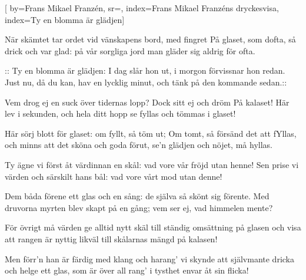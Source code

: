 

[ 		%
	by={Frans Mikael Franzén},					%
	sr={},					%
	index={Frans Mikael Franzéns dryckesvisa}, %
	index={Ty en blomma är glädjen}]						%
	
\beginverse*						%
När skämtet tar ordet vid vänskapens bord,
med fingret På glaset, som dofta,
så drick och var glad: på vår sorgliga jord
man gläder sig aldrig för ofta.
\endverse							%

\beginchorus						%
:: Ty en blomma är glädjen: I dag slår hon ut,
i morgon förvissnar hon redan.
Just nu, då du kan, hav en lycklig minut,
och tänk på den kommande sedan.::
\endchorus							%

\beginverse*						%
Vem drog ej en suck över tidernas lopp?
Dock sitt ej och dröm På kalaset!
Här lev i sekunden, och hela ditt hopp
se fyllas och tömmas i glaset!
\endverse							%

\beginchorus						%
Här sörj blott för glaset: om fyllt, så töm ut;
Om tomt, så försänd det att fYllas,
och minns att det sköna och goda förut,
se'n glädjen och nöjet, må hyllas.
\endchorus							%

\beginverse*						%
Ty ägne vi först åt värdinnan en skål:
vad vore vår fröjd utan henne!
Sen prise vi värden och särskilt hans bål:
vad vore vårt mod utan denne!
\endverse							%

\beginchorus						%
Dem båda förene ett glas och en sång:
de själva så skönt sig förente.
Med druvorna myrten blev skapt på en gång;
vem ser ej, vad himmelen mente?
\endchorus

\beginverse*						%
För övrigt må värden ge alltid nytt skäl
till ständig omsättning på glasen
och visa att rangen är nyttig likväl
till skålarnas mängd på kalasen!
\endverse							%

\beginchorus						%
Men förr'n han är färdig med klang och harang'
vi skynde att självmante dricka
och helge ett glas, som är över all rang'
i tysthet envar åt sin flicka!
\endchorus							%
\endsong							%